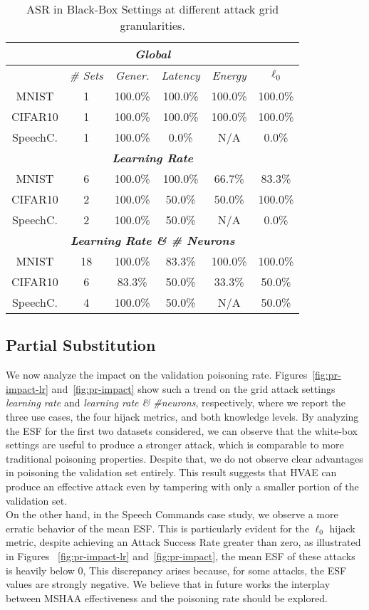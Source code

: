 \begin{table}[!htpb]
\centering
\footnotesize
\caption{ASR in Black-Box Settings at different attack grid granularities.}
\begin{tabular}{c|c|c|c|c|c}  \toprule
\multicolumn{6}{c}{\textit{\textbf{Global}}} \\ \midrule
 & \textit{\# Sets} & \textit{Gener.} & \textit{Latency} & \textit{Energy} & \textit{$\ell_0$} \\ \midrule
MNIST & 1 & 100.0\% & 100.0\% & 100.0\% & 100.0\% \\
CIFAR10 & 1   & 100.0\% & 100.0\% & 100.0\% & 100.0\% \\
SpeechC.  & 1 & 100.0\% & 0.0\% & N/A & 0.0\% \\ \midrule
\multicolumn{6}{c}{\textit{\textbf{Learning Rate}}} \\ \midrule
MNIST & 6 &  100.0\% & 100.0\% & 66.7\% & 83.3\% \\
CIFAR10 & 2 & 100.0\% & 50.0\% & 50.0\% & 100.0\% \\
SpeechC. & 2 & 100.0\% & 50.0\% & N/A & 0.0\% \\ \midrule
\multicolumn{6}{c}{\textit{\textbf{Learning Rate \& \# Neurons}}} \\ \midrule
MNIST & 18 & 100.0\% & 83.3\% & 100.0\% & 100.0\% \\
CIFAR10 & 6 & 83.3\% & 50.0\% & 33.3\% & 50.0\% \\
SpeechC. & 4 & 100.0\% & 50.0\% & N/A & 50.0\% \\ \bottomrule
\end{tabular}
\label{tab.asr-bb}
\end{table}

\subsection{Partial Substitution}
We now analyze the impact on the validation poisoning rate. 
Figures~\ref{fig:pr-impact-lr} and~\ref{fig:pr-impact} show such a trend on the grid attack settings \textit{learning rate} and \textit{learning rate \& \#neurons}, respectively, where we report the three use cases, the four hijack metrics, and both knowledge levels. 
By analyzing the ESF for the first two datasets considered, we can observe that the white-box settings are useful to produce a stronger attack, which is comparable to more traditional poisoning properties. Despite that, we do not observe clear advantages in poisoning the validation set entirely. This result suggests that HVAE can produce an effective attack even by tampering with only a smaller portion of the validation set.\\
On the other hand, in the Speech Commands case study, we observe a more erratic behavior of the mean ESF. This is particularly evident for the $\ell_0$ hijack metric, despite achieving an Attack Success Rate greater than zero, as illustrated in Figures ~\ref{fig:pr-impact-lr} and~\ref{fig:pr-impact}, the mean ESF of these attacks is heavily below 0,  This discrepancy arises because, for some attacks, the ESF values are strongly negative.
We believe that in future works the interplay between MSHAA effectiveness and the poisoning rate should be explored. 

